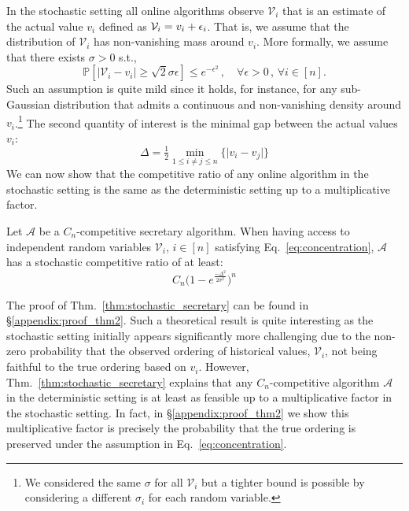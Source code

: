 In the stochastic setting all online algorithms observe $\mathcal{V}_i$ that is an estimate of the actual value $v_i$ defined as $\mathcal{V}_i = v_i + {\epsilon}_i$. That is, we assume that the distribution of $\mathcal{V}_{i}$ has non-vanishing mass around $v_i$. More formally, we assume that there exists $\sigma>0$ s.t., 
    \begin{equation}
        \mathbb{P}[|\mathcal{V}_{i}-v_i| \geq \sqrt{2}\sigma \epsilon] \leq e^{-\epsilon^2} \,,\quad \forall \epsilon >0\,,\,\forall i \in [n].
        \label{eq:concentration}
    \end{equation}
Such an assumption is quite mild since it holds, for instance, for any sub-Gaussian distribution that admits a continuous and non-vanishing density around $v_i$.\footnote{We considered the same $\sigma$ for all $\mathcal{V}_{i}$ but a tighter bound is possible by considering a different $\sigma_i$ for each random variable.}
The second quantity of interest is the minimal gap between the actual values $v_i$: 
\begin{equation}
    \Delta = \tfrac{1}{2}\min_{1\leq i \neq j \leq  n } \{\mid v_i - v_j \mid \}
\end{equation}
We can now show that the competitive ratio of any online algorithm in the stochastic setting is the same as the deterministic setting up to a multiplicative factor.

\begin{theorem}\label{thm:stochastic_secretary}
Let $\mathcal{A}$ be a $C_n$-competitive secretary algorithm. When having access to independent random variables $\mathcal{V}_{i},\, i\in [n]$ satisfying Eq.~\ref{eq:concentration}, $\mathcal{A}$ has a stochastic competitive ratio of at least:  
\begin{equation}
    C_n \big(1 - e^{\frac{-\Delta^2}{2\sigma^2}}\big)^{n}
\end{equation}
\end{theorem}

The proof of Thm.~\ref{thm:stochastic_secretary} can be found in \S\ref{appendix:proof_thm2}. Such a theoretical result is quite interesting as the stochastic setting initially appears significantly more challenging due to the non-zero probability that the observed ordering of historical values, $\mathcal{V}_i$, not being faithful to the true ordering based on $v_i$. However, Thm.~\ref{thm:stochastic_secretary} explains that any $C_n$-competitive algorithm $\mathcal{A}$ in the deterministic setting is at least as feasible up to a multiplicative factor in the stochastic setting. In fact, in \S\ref{appendix:proof_thm2} we show this multiplicative factor is precisely the probability that the true ordering  is preserved under the assumption in Eq.~\ref{eq:concentration}.


